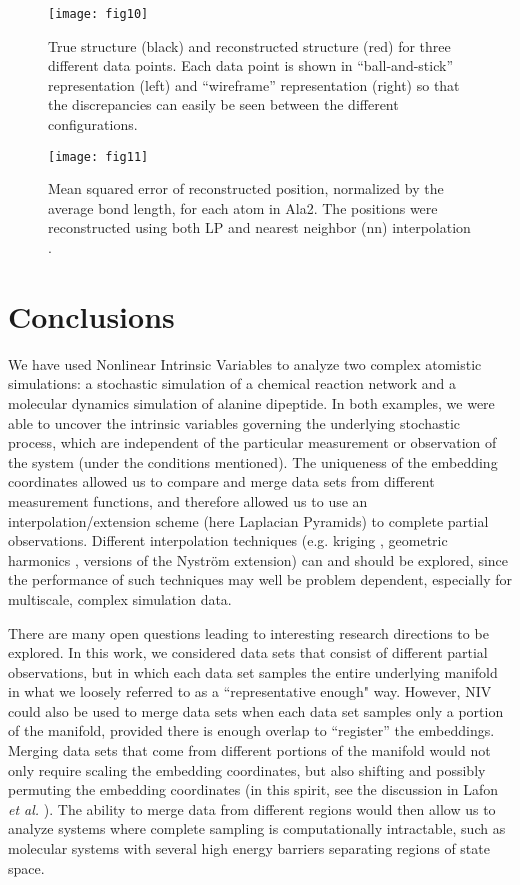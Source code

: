 \documentclass[aip,jcp,preprint]{revtex4-1}
\begin{document}
\begin{figure*}[ht]
    \centering
    \texttt{[image: fig10]}
    \caption{True structure (black) and reconstructed structure (red) for three different data points. Each data point is shown in ``ball-and-stick'' representation (left) and ``wireframe'' representation (right) so that the discrepancies can easily be seen between the different configurations.}
    \label{fig:ala_molecules}
\end{figure*}

\begin{figure*}
    \texttt{[image: fig11]}
    \caption{Mean squared error of reconstructed position, normalized by the average bond length, for each atom in Ala2.
    The positions were reconstructed using both LP and nearest neighbor (nn) interpolation .}
    \label{fig:ala_mse}
\end{figure*}

\section{Conclusions} \label{sec:conclusions}
%
We have used Nonlinear Intrinsic Variables to analyze two complex atomistic simulations: a stochastic simulation of a chemical reaction network and a molecular dynamics simulation of alanine dipeptide.
%
In both examples, we were able to uncover the intrinsic variables governing the underlying stochastic process, which are independent
of the particular measurement or observation  of the system (under the conditions mentioned).
%
The uniqueness of the embedding coordinates allowed us to compare and merge data sets from different measurement functions,
and therefore allowed us to use an interpolation/extension scheme (here Laplacian Pyramids) to complete partial observations.
%
Different interpolation techniques (e.g. kriging \cite{matheron1963principles, matheron1973intrinsic}, geometric harmonics \cite{coifman2006geometric},  versions of the Nystr\"{o}m extension) can and should
be explored, since the performance of such techniques may well be problem dependent, especially for multiscale, complex simulation data.

There are many open questions leading to interesting research directions to be explored.
%
In this work, we considered data sets that consist of different partial observations, but in which each data set samples the entire underlying manifold in
what we loosely referred to as a ``representative enough" way.
%
However, NIV could also be used to merge data sets when each data set samples only a portion of the manifold, provided there is enough overlap to ``register'' the embeddings.
%
Merging data sets that come from different portions of the manifold would not only require scaling the embedding coordinates,
but also shifting and possibly permuting the embedding coordinates (in this spirit, see the discussion in Lafon {\em et al.} \cite{lafon2006data}).
%
The ability to merge data from different regions would then allow us to analyze systems where complete sampling is computationally intractable,
such as molecular systems with several high energy barriers separating regions of state space.
\end{document}
